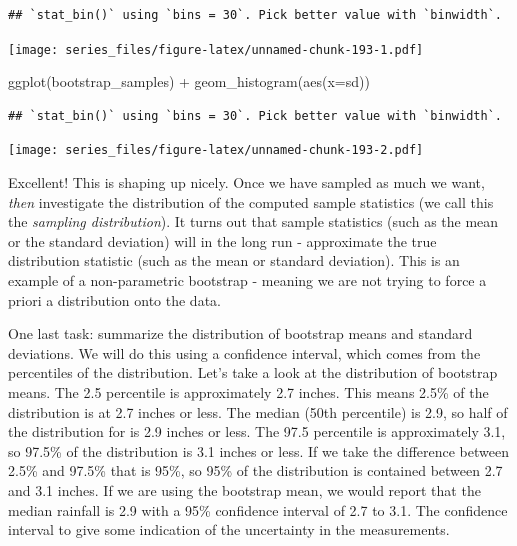 \documentclass[
]{book}
\newenvironment{Shaded}{\begin{snugshade}}{\end{snugshade}}
\newcommand{\AttributeTok}[1]{\textcolor[rgb]{0.77,0.63,0.00}{#1}}
\newcommand{\FunctionTok}[1]{\textcolor[rgb]{0.00,0.00,0.00}{#1}}
\newcommand{\NormalTok}[1]{#1}
\newcommand{\SpecialCharTok}[1]{\textcolor[rgb]{0.00,0.00,0.00}{#1}}
\theoremstyle{definition}
\theoremstyle{definition}
\theoremstyle{definition}
\theoremstyle{remark}
\begin{document}
\begin{verbatim}
## `stat_bin()` using `bins = 30`. Pick better value with `binwidth`.
\end{verbatim}

\texttt{[image: series\_files/figure-latex/unnamed-chunk-193-1.pdf]}

\begin{Shaded}
\begin{Highlighting}[]
  \FunctionTok{ggplot}\NormalTok{(bootstrap\_samples) }\SpecialCharTok{+}
    \FunctionTok{geom\_histogram}\NormalTok{(}\FunctionTok{aes}\NormalTok{(}\AttributeTok{x=}\NormalTok{sd))}
\end{Highlighting}
\end{Shaded}

\begin{verbatim}
## `stat_bin()` using `bins = 30`. Pick better value with `binwidth`.
\end{verbatim}

\texttt{[image: series\_files/figure-latex/unnamed-chunk-193-2.pdf]}

Excellent! This is shaping up nicely. Once we have sampled as much we want, \emph{then} investigate the distribution of the computed sample statistics (we call this the \emph{sampling distribution}). It turns out that sample statistics (such as the mean or the standard deviation) will in the long run - approximate the true distribution statistic (such as the mean or standard deviation). This is an example of a non-parametric bootstrap - meaning we are not trying to force a priori a distribution onto the data.

One last task: summarize the distribution of bootstrap means and standard deviations. We will do this using a confidence interval, which comes from the percentiles of the distribution. Let's take a look at the distribution of bootstrap means. The 2.5 percentile is approximately 2.7 inches. This means 2.5\% of the distribution is at 2.7 inches or less. The median (50th percentile) is 2.9, so half of the distribution for is 2.9 inches or less. The 97.5 percentile is approximately 3.1, so 97.5\% of the distribution is 3.1 inches or less. If we take the difference between 2.5\% and 97.5\% that is 95\%, so 95\% of the distribution is contained between 2.7 and 3.1 inches. If we are using the bootstrap mean, we would report that the median rainfall is 2.9 with a 95\% confidence interval of 2.7 to 3.1. The confidence interval to give some indication of the uncertainty in the measurements.
\end{document}
